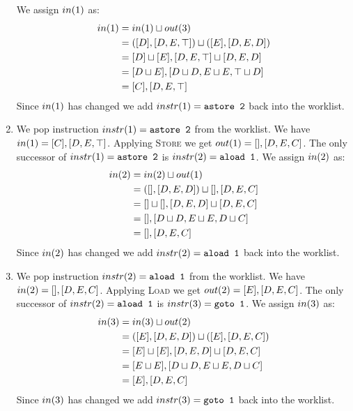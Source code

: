 \documentclass{article}
\begin{document}
\begin{example}
\begin{enumerate}
    We assign $in(1)$ as:
    \begin{align*}
      in(1) &= in(1) \sqcup out(3) \\
               &= ([D], [D,E,\top]) \sqcup ([E], [D,E,D]) \\
               &= [D] \sqcup [E], [D,E,\top] \sqcup [D,E,D] \\
               &= [D \sqcup E], [D \sqcup D, E \sqcup E, \top \sqcup D] \\
               &= [C], [D, E, \top]
    \end{align*}
    Since $in(1)$ has changed we add $instr{}(1) = \texttt{astore 2}$ back into the worklist.
  \item We pop instruction $instr{}(1) = \texttt{astore 2}$ from the worklist.
    We have $in(1) = [C], [D, E, \top]$.
    Applying \textsc{Store} we get $out(1) = [], [D, E, C]$.
    The only successor of $instr{}(1) = \texttt{astore 2}$ is $instr{}(2) = \texttt{aload 1}$.
    We assign $in(2)$ as:
    \begin{align*}
      in(2) &= in(2) \sqcup out(1) \\
               &= ([], [D,E,D]) \sqcup [], [D, E, C] \\
               &= [] \sqcup [], [D,E,D] \sqcup [D,E,C] \\
               &= [], [D \sqcup D, E \sqcup E, D \sqcup C] \\
               &= [], [D,E,C]
    \end{align*}
    Since $in(2)$ has changed we add $instr{}(2) = \texttt{aload 1}$ back into the worklist.
  \item We pop instruction $instr{}(2) = \texttt{aload 1}$ from the worklist.
    We have $in(2) = [], [D,E,C]$.
    Applying \textsc{Load} we get $out(2) = [E], [D,E,C]$.
    The only successor of $instr{}(2) = \texttt{aload 1}$ is $instr{}(3) = \texttt{goto 1}$.
    We assign $in(3)$ as:
    \begin{align*}
      in(3) & = in(3) \sqcup out(2) \\
               &= ([E], [D,E,D]) \sqcup ([E], [D,E,C]) \\
               &= [E] \sqcup [E], [D,E,D] \sqcup [D,E,C] \\
               &= [E \sqcup E], [D \sqcup D, E \sqcup E, D \sqcup C] \\
               &= [E], [D,E,C]
    \end{align*}
    Since $in(3)$ has changed we add $instr{}(3) = \texttt{goto 1}$ back into the worklist.

\end{enumerate}
\end{example}
\end{document}
